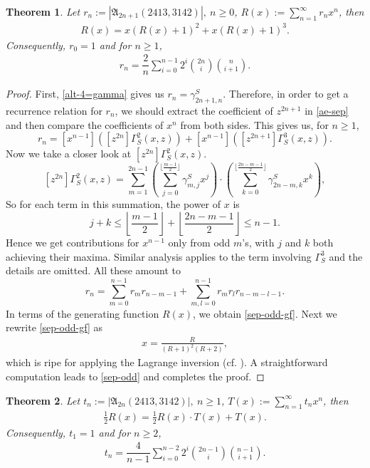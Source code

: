 \documentclass[12pt,reqno]{amsart}
\numberwithin{equation}{section}
\theoremstyle{plain}
\newtheorem{theorem}{Theorem}[section]
\theoremstyle{definition}
\def\A{\mathfrak{A}}
\begin{document}
\begin{theorem}\label{thm:alt-2413-odd}
Let $r_{n}:=|\A_{2n+1}(2413,3142)|,\:n\ge 0$, $R(x):=\sum\limits_{n=1}^{\infty}r_{n}x^n$, then
\begin{align}\label{sep-odd-gf}
R(x)=x(R(x)+1)^2+x(R(x)+1)^3.
\end{align}
Consequently, $r_0=1$ and for $n\ge 1$,
\begin{align}\label{sep-odd}
r_{n}=\dfrac{2}{n}\sum_{i=0}^{n-1}2^{i}\binom{2n}{i}\binom{n}{i+1}.
\end{align}
\end{theorem}
\begin{proof}
First, \eqref{alt-4=gamma} gives us $r_n=\gamma^S_{2n+1,n}$. Therefore, in order to get a recurrence relation for $r_n$, we should extract the coefficient of $z^{2n+1}$ in \eqref{ae-sep} and then compare the coefficients of $x^n$ from both sides. This gives us, for $n\ge 1$,
$$r_n=[x^{n-1}]\left([z^{2n}]\Gamma^2_S(x,z)\right)+[x^{n-1}]\left([z^{2n+1}]\Gamma^3_S(x,z)\right).$$
Now we take a closer look at $[z^{2n}]\Gamma^2_S(x,z)$.
$$[z^{2n}]\Gamma^2_S(x,z)=\sum_{m=1}^{2n-1}\left(\sum_{j=0}^{\lfloor\frac{m-1}{2}\rfloor}\gamma^S_{m,j}x^j\right)\cdot\left(\sum_{k=0}^{\lfloor\frac{2n-m-1}{2}\rfloor}\gamma^S_{2n-m,k}x^k\right),$$
So for each term in this summation, the power of $x$ is $$j+k\le\left\lfloor\frac{m-1}{2}\right\rfloor+\left\lfloor\frac{2n-m-1}{2}\right\rfloor\le n-1.$$
Hence we get contributions for $x^{n-1}$ only from odd $m$'s, with $j$ and $k$ both achieving their maxima. Similar analysis applies to the term involving $\Gamma^3_S$ and the details are omitted. All these amount to
$$r_n=\sum_{m=0}^{n-1}r_mr_{n-m-1}+\sum_{m,l=0}^{n-1}r_mr_lr_{n-m-l-1}.$$
In terms of the generating function $R(x)$, we obtain \eqref{sep-odd-gf}. Next we rewrite \eqref{sep-odd-gf} as
\begin{align}\label{sep-even-lag}
x=\frac{R}{(R+1)^2(R+2)},
\end{align}
which is ripe for applying the Lagrange inversion (cf. \cite{FSe}). A straightforward computation leads to \eqref{sep-odd} and completes the proof.
\end{proof}

\begin{theorem}
Let $t_n:=|\A_{2n}(2413,3142)|,\:n\ge 1$, $T(x):=\sum\limits_{n=1}^{\infty}t_nx^n$, then
\begin{align}\label{sep-even-gf}
\frac{1}{2}R(x)=\frac{1}{2}R(x)\cdot T(x)+T(x).
\end{align}
Consequently, $t_1=1$ and for $n\ge 2$,
\begin{align}\label{sep-even}
t_{n}=\dfrac{4}{n-1}\sum_{i=0}^{n-2}2^{i}\binom{2n-1}{i}\binom{n-1}{i+1}.
\end{align}
\end{theorem}
\end{document}
